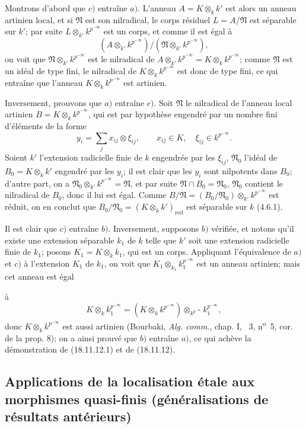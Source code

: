 Montrons d'abord que $c)$ entraîne $a)$. L'anneau $A=K\otimes_k k'$ est alors un anneau artinien local, et si $\mathfrak N$ est son nilradical, le corps résiduel $L=A/\mathfrak N$ est séparable sur $k'$; par suite $L\otimes_{k'}k^{p^{-\infty}}$ est un corps, et comme il est égal à
\[
  (A\otimes_{k'}k^{p^{-\infty}})/(\mathfrak N\otimes_{k'}k^{p^{-\infty}}),
\]
on voit que $\mathfrak N\otimes_{k'}k^{p^{-\infty}}$ est le nilradical de $A\otimes_{k'}k^{p^{-\infty}}=K\otimes_k k^{p^{-\infty}}$; comme $\mathfrak N$ est un idéal de type fini, le nilradical de $K\otimes_k k^{p^{-\infty}}$ est donc de type fini, ce qui entraîne que l'anneau $K\otimes_k k^{p^{-\infty}}$ est artinien.

Inversement, prouvons que $a)$ entraîne $c)$. Soit $\mathfrak N$ le nilradical de l'anneau local artinien $B=K\otimes_k k^{p^{-\infty}}$, qui est par hypothèse engendré par un nombre fini d'éléments de la forme
\[
  y_i=\sum_j x_{ij}\otimes\xi_{ij},\qquad x_{ij}\in K,\quad \xi_{ij}\in k^{p^{-\infty}}.
\]
Soient $k'$ l'extension radicielle finie de $k$ engendrée par les $\xi_{ij}$, $\mathfrak N_0$ l'idéal de $B_0=K\otimes_k k'$ engendré par les $y_i$; il est clair que les $y_i$ sont nilpotents dans $B_0$; d'autre part, on a $\mathfrak N_0\otimes_{k'}k^{p^{-\infty}}=\mathfrak N$, et par suite $\mathfrak N\cap B_0=\mathfrak N_0$, $\mathfrak N_0$ contient le nilradical de $B_0$, donc il lui est égal. Comme $B/\mathfrak N=(B_0/\mathfrak N_0)\otimes_{k'}k^{p^{-\infty}}$ est réduit, on en conclut que $B_0/\mathfrak N_0=(K\otimes_k k')_{\mathrm{red}}$ est séparable sur $k$ (4.6.1).

Il est clair que $c)$ entraîne $b)$. Inversement, supposons $b)$ vérifiée, et notons qu'il existe une extension séparable $k_1$ de $k$ telle que $k'$ soit une extension radicielle finie de $k_1$; posons $K_1=K\otimes_k k_1$, qui est un corps. Appliquant l'équivalence de $a)$ et $c)$ à l'extension $K_1$ de $k_1$, on voit que $K_1\otimes_{k_1}k_1^{p^{-\infty}}$ est un anneau artinien; mais cet anneau est égal


à
\[
  K\otimes_k k_1^{p^{-\infty}}=(K\otimes_k k^{p^{-\infty}})\otimes_{k^{p^{-\infty}}}k_1^{p^{-\infty}},
\]
donc $K\otimes_k k^{p^{-\infty}}$ est aussi artinien (Bourbaki, \emph{Alg. comm.}, chap. I, \textsection~3, n\textsuperscript{o}~5, cor. de la prop. 8); on a ainsi prouvé que $b)$ entraîne $a)$, ce qui achève la démonstration de (18.11.12.1) et de (18.11.12).

\subsection{Applications de la localisation étale aux morphismes quasi-finis (généralisations de résultats antérieurs)}
\label{subsection:IV.18.12}

